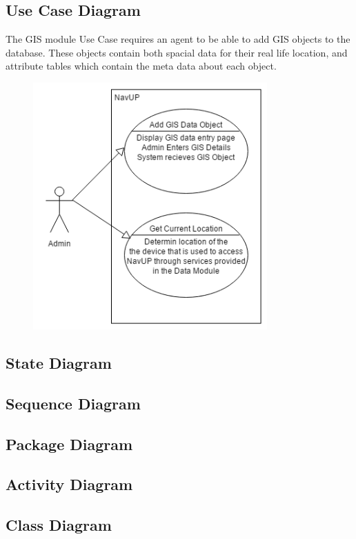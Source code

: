 \subsection{Use Case Diagram}

The GIS module Use Case requires an agent to be able to add GIS objects to the database. These objects contain both spacial data for their real life location, and attribute tables which contain the meta data about each object. \\

\begin{figure} 
  \includegraphics[width=0.8\textwidth]{GIS/GIS_Use_case.png}
\end{figure}

\subsection{State Diagram}

\subsection{Sequence Diagram}

\subsection{Package Diagram}

\subsection{Activity Diagram}

\subsection{Class Diagram}
